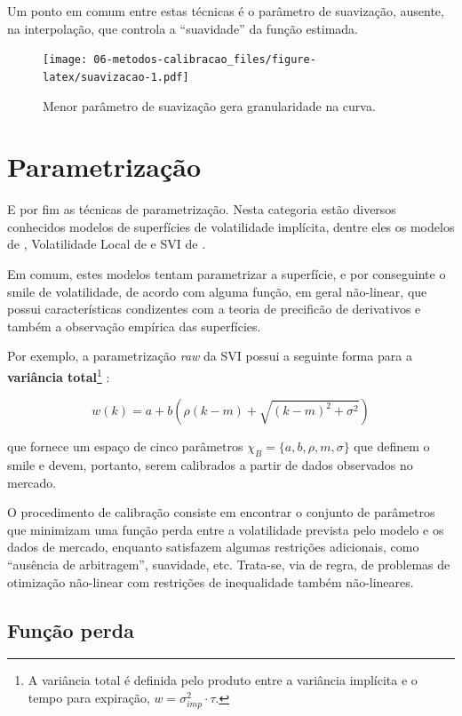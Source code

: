 \documentclass[]{book}
\let\rmarkdownfootnote\footnote%
\def\footnote{\protect\rmarkdownfootnote}
\theoremstyle{definition}
\theoremstyle{definition}
\theoremstyle{definition}
\theoremstyle{remark}
\begin{document}
Um ponto em comum entre estas técnicas é o parâmetro de suavização,
ausente, na interpolação, que controla a ``suavidade'' da função
estimada.

\begin{figure}
\centering
\texttt{[image: 06-metodos-calibracao\_files/figure-latex/suavizacao-1.pdf]}
\caption{\label{fig:suavizacao}Menor parâmetro de suavização gera
granularidade na curva.}
\end{figure}

\section{Parametrização}\label{parametrizacao}

E por fim as técnicas de parametrização. Nesta categoria estão diversos
conhecidos modelos de superfícies de volatilidade implícita, dentre eles
os modelos de \citet{Heston1993}, Volatilidade Local de
\citet{Dupire1994} e SVI de \citet{Gatheral2004}.

Em comum, estes modelos tentam parametrizar a superfície, e por
conseguinte o smile de volatilidade, de acordo com alguma função, em
geral não-linear, que possui características condizentes com a teoria de
precificão de derivativos e também a observação empírica das
superfícies.

Por exemplo, a parametrização \emph{raw} da SVI possui a seguinte forma
para a \textbf{variância total}\footnote{A variância total é definida
  pelo produto entre a variância implícita e o tempo para expiração,
  \(w=\sigma^2_{imp}\cdot\tau\).} :

\[ w(k) = a + b\left(\rho(k-m)+\sqrt{(k-m)^2 + \sigma^2}\right)\]

que fornece um espaço de cinco parâmetros
\(\chi_B=\{a, b, \rho, m, \sigma\}\) que definem o smile e devem,
portanto, serem calibrados a partir de dados observados no mercado.

O procedimento de calibração consiste em encontrar o conjunto de
parâmetros que minimizam uma função perda entre a volatilidade prevista
pelo modelo e os dados de mercado, enquanto satisfazem algumas
restrições adicionais, como ``ausência de arbitragem'', suavidade, etc.
Trata-se, via de regra, de problemas de otimização não-linear com
restrições de inequalidade também não-lineares.

\subsection{Função perda}\label{funcao-perda}
\end{document}
